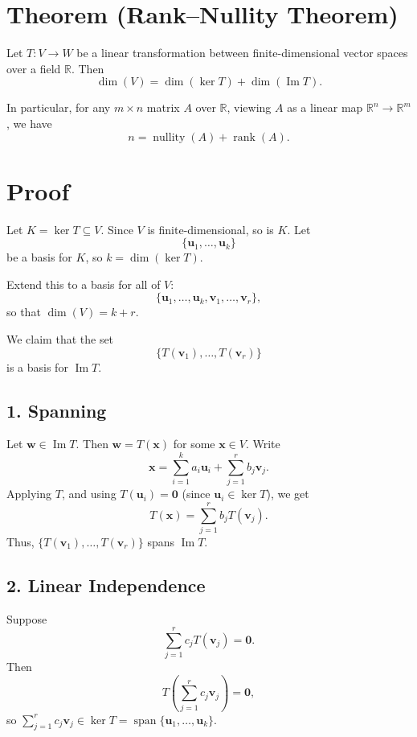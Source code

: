 \section*{Theorem (Rank--Nullity Theorem)}

Let $ T: V \to W $ be a linear transformation between finite-dimensional vector spaces over a field $ \mathbb{R} $. Then
\[
\dim(V) = \dim(\ker T) + \dim(\operatorname{Im} T).
\]

In particular, for any $ m \times n $ matrix $ A $ over $ \mathbb{R} $, viewing $ A $ as a linear map $ \mathbb{R}^n \to \mathbb{R}^m $, we have
\[
n = \operatorname{nullity}(A) + \operatorname{rank}(A).
\]

\section*{Proof}

Let $ K = \ker T \subseteq V $. Since $ V $ is finite-dimensional, so is $ K $. Let
\[
\{ \mathbf{u}_1, \dots, \mathbf{u}_k \}
\]
be a basis for $ K $, so $ k = \dim(\ker T) $.

Extend this to a basis for all of $ V $:
\[
\{ \mathbf{u}_1, \dots, \mathbf{u}_k, \mathbf{v}_1, \dots, \mathbf{v}_r \},
\]
so that $ \dim(V) = k + r $.

We claim that the set
\[
\{ T(\mathbf{v}_1), \dots, T(\mathbf{v}_r) \}
\]
is a basis for $ \operatorname{Im} T $.

\subsection*{1. Spanning}

Let $ \mathbf{w} \in \operatorname{Im} T $. Then $ \mathbf{w} = T(\mathbf{x}) $ for some $ \mathbf{x} \in V $. Write
\[
\mathbf{x} = \sum_{i=1}^k a_i \mathbf{u}_i + \sum_{j=1}^r b_j \mathbf{v}_j.
\]
Applying $ T $, and using $ T(\mathbf{u}_i) = \mathbf{0} $ (since $ \mathbf{u}_i \in \ker T $), we get
\[
T(\mathbf{x}) = \sum_{j=1}^r b_j T(\mathbf{v}_j).
\]
Thus, $ \{ T(\mathbf{v}_1), \dots, T(\mathbf{v}_r) \} $ spans $ \operatorname{Im} T $.

\subsection*{2. Linear Independence}

Suppose
\[
\sum_{j=1}^r c_j T(\mathbf{v}_j) = \mathbf{0}.
\]
Then
\[
T\left( \sum_{j=1}^r c_j \mathbf{v}_j \right) = \mathbf{0},
\]
so $ \sum_{j=1}^r c_j \mathbf{v}_j \in \ker T = \operatorname{span}\{ \mathbf{u}_1, \dots, \mathbf{u}_k \} $.

